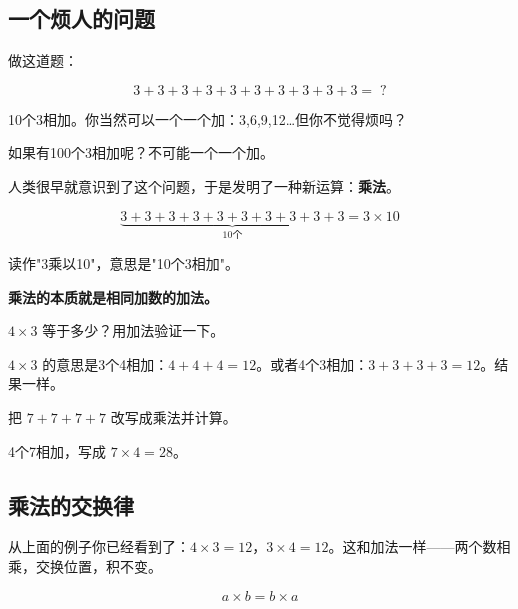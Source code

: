 

\subsection*{一个烦人的问题}

做这道题：

\[
3+3+3+3+3+3+3+3+3+3 = \;?
\]

10个3相加。你当然可以一个一个加：3,6,9,12\ldots 但你不觉得烦吗？

如果有100个3相加呢？不可能一个一个加。

人类很早就意识到了这个问题，于是发明了一种新运算：\textbf{乘法}。

\[
\underbrace{3+3+3+3+3+3+3+3+3+3}_{10\text{个}} = 3 \times 10
\]

读作"3乘以10"，意思是"10个3相加"。

\textbf{乘法的本质就是相同加数的加法。}

\begin{example}
$4\times3$ 等于多少？用加法验证一下。
\end{example}
\begin{solution}
$4\times3$ 的意思是3个4相加：$4+4+4 = 12$。或者4个3相加：$3+3+3+3 = 12$。结果一样。
\end{solution}

\begin{example}
把 $7+7+7+7$ 改写成乘法并计算。
\end{example}
\begin{solution}
4个7相加，写成 $7\times4 = 28$。
\end{solution}

\subsection*{乘法的交换律}

从上面的例子你已经看到了：$4\times3=12$，$3\times4=12$。这和加法一样——两个数相乘，交换位置，积不变。

\[
a \times b = b \times a
\]

